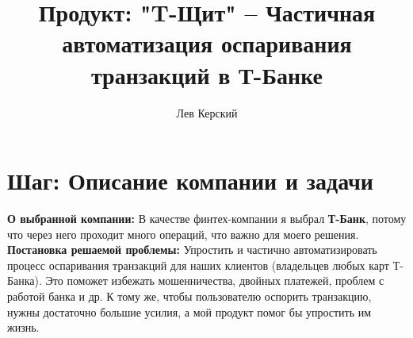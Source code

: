 \documentclass[12pt,a4paper]{article}
\title{Продукт: "T-Щит" – Частичная автоматизация оспаривания транзакций в Т-Банке}
\author{Лев Керский}
\begin{document}
\maketitle

\hline

\section{Шаг: Описание компании и задачи}
\textbf{О выбранной компании:} В качестве финтех-компании я выбрал \textbf{Т-Банк}, потому что через него проходит много операций, что важно для моего решения. \\
\textbf{Постановка решаемой проблемы:} Упростить и частично автоматизировать процесс оспаривания транзакций для наших клиентов (владельцев любых карт Т-Банка). Это поможет избежать мошенничества, двойных платежей, проблем с работой банка и др. К тому же, чтобы пользователю оспорить транзакцию, нужны достаточно большие усилия, а мой продукт помог бы упростить им жизнь.
\end{document}
